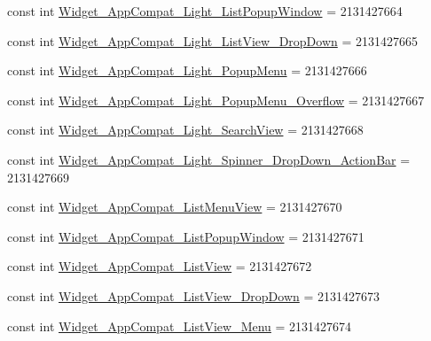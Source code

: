 \begin{DoxyCompactItemize}
\item 
const int \mbox{\hyperlink{class_f_w_p_s___app_1_1_droid_1_1_resource_1_1_style_a1cd6fea37c9a9b6724dfa09e410631a2}{Widget\+\_\+\+App\+Compat\+\_\+\+Light\+\_\+\+List\+Popup\+Window}} = 2131427664
\item 
const int \mbox{\hyperlink{class_f_w_p_s___app_1_1_droid_1_1_resource_1_1_style_aacce4bbc51a2129c33a0f035708bc056}{Widget\+\_\+\+App\+Compat\+\_\+\+Light\+\_\+\+List\+View\+\_\+\+Drop\+Down}} = 2131427665
\item 
const int \mbox{\hyperlink{class_f_w_p_s___app_1_1_droid_1_1_resource_1_1_style_a86e9cca3b8061688ab3e24e4a76bc1ba}{Widget\+\_\+\+App\+Compat\+\_\+\+Light\+\_\+\+Popup\+Menu}} = 2131427666
\item 
const int \mbox{\hyperlink{class_f_w_p_s___app_1_1_droid_1_1_resource_1_1_style_a15b37663e7fdd2d66889e20bdf921703}{Widget\+\_\+\+App\+Compat\+\_\+\+Light\+\_\+\+Popup\+Menu\+\_\+\+Overflow}} = 2131427667
\item 
const int \mbox{\hyperlink{class_f_w_p_s___app_1_1_droid_1_1_resource_1_1_style_a8975ca22352979a668a400d710dee3da}{Widget\+\_\+\+App\+Compat\+\_\+\+Light\+\_\+\+Search\+View}} = 2131427668
\item 
const int \mbox{\hyperlink{class_f_w_p_s___app_1_1_droid_1_1_resource_1_1_style_afb9584b88b6e7dd8e2d9b21da170585c}{Widget\+\_\+\+App\+Compat\+\_\+\+Light\+\_\+\+Spinner\+\_\+\+Drop\+Down\+\_\+\+Action\+Bar}} = 2131427669
\item 
const int \mbox{\hyperlink{class_f_w_p_s___app_1_1_droid_1_1_resource_1_1_style_ac74007de412f588e93bf3341050e9937}{Widget\+\_\+\+App\+Compat\+\_\+\+List\+Menu\+View}} = 2131427670
\item 
const int \mbox{\hyperlink{class_f_w_p_s___app_1_1_droid_1_1_resource_1_1_style_a9136cefd15e1176c824c01732000b818}{Widget\+\_\+\+App\+Compat\+\_\+\+List\+Popup\+Window}} = 2131427671
\item 
const int \mbox{\hyperlink{class_f_w_p_s___app_1_1_droid_1_1_resource_1_1_style_aa5fcdc765689a47851f4f9794d81d2de}{Widget\+\_\+\+App\+Compat\+\_\+\+List\+View}} = 2131427672
\item 
const int \mbox{\hyperlink{class_f_w_p_s___app_1_1_droid_1_1_resource_1_1_style_a261b0a6ac6640a6252a9b446d3e49326}{Widget\+\_\+\+App\+Compat\+\_\+\+List\+View\+\_\+\+Drop\+Down}} = 2131427673
\item 
const int \mbox{\hyperlink{class_f_w_p_s___app_1_1_droid_1_1_resource_1_1_style_a4536090c4b2910fedf381d632f18c7ba}{Widget\+\_\+\+App\+Compat\+\_\+\+List\+View\+\_\+\+Menu}} = 2131427674

\end{DoxyCompactItemize}
